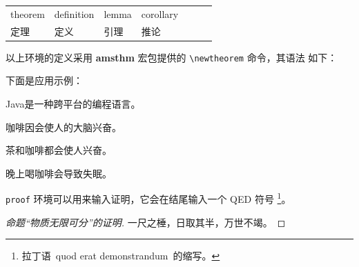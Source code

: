 \begin{center}
\begin{tabular}{*{7}{l}}\hline
  theorem & definition & lemma & corollary &\\
  定理 & 定义 & 引理 & 推论 &\\\hline
\end{tabular}
\end{center}

以上环境的定义采用 \textbf{amsthm} 宏包提供的 \verb|\newtheorem| 命令，其语法
如下：

\begin{latex}
\newtheorem{环境名}[编号延续]{显示名}[编号层次]
\end{latex}

下面是应用示例：
\begin{definition}
Java是一种跨平台的编程语言。
\end{definition}

\begin{theorem}
咖啡因会使人的大脑兴奋。
\end{theorem}

\begin{lemma}
茶和咖啡都会使人兴奋。
\end{lemma}

\begin{corollary}
晚上喝咖啡会导致失眠。
\end{corollary}

\texttt{proof} 环境可以用来输入证明，它会在结尾输入一个 QED 符号
\footnote{拉丁语~quod erat demonstrandum~的缩写。}。

\begin{proof}[命题“物质无限可分”的证明]
一尺之棰，日取其半，万世不竭。
\end{proof}